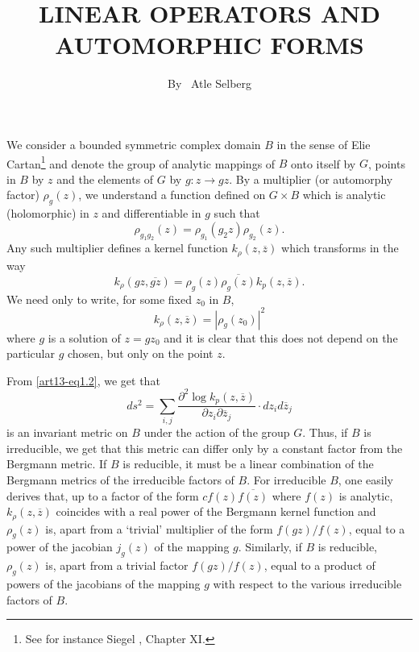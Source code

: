 \title{LINEAR OPERATORS AND AUTOMORPHIC FORMS}

\author{By~ Atle Selberg}

\date{}
\maketitle

\setcounter{pageoriginal}{202}
\section{}\label{art13-sec1}\pageoriginale
We consider a bounded symmetric complex domain $B$ in the sense of Elie Cartan\footnote{See for instance Siegel \cite{art13-key5}, Chapter XI.} and denote the group of analytic mappings of $B$ onto itself by $G$, points in $B$ by $z$ and the elements of $G$ by $g:z\to gz$. By a multiplier (or automorphy factor) $\rho_{g}(z)$, we understand a function defined on $G\times B$ which is analytic (holomorphic) in $z$ and differentiable in $g$ such that
\begin{equation}
\rho_{g_{1}g_{2}}(z)=\rho_{g_{1}}(g_{2}z)\rho_{g_{2}}(z).\label{art13-eq1.1}
\end{equation}
Any such multiplier defines a kernel function $k_{\rho}(z,\overline{z})$ which transforms in the way
\begin{equation}
k_{\rho}(gz,\overline{gz})=\rho_{g}(z)\overline{\rho_{g}(z)}k_{p}(z,\overline{z}).\label{art13-eq1.2}
\end{equation}
We need only to write, for some fixed $z_{0}$ in $B$,
$$
k_{\rho}(z,\overline{z})=|\rho_{g}(z_{0})|^{2}
$$
where $g$ is a solution of $z=gz_{0}$ and it is clear that this does not depend on the particular $g$ chosen, but only on the point $z$.

From \eqref{art13-eq1.2}, we get that
$$
ds^{2}=\sum\limits_{i,j}\frac{\partial^{2}\log k_{p}(z,\overline{z})}{\partial z_{i}\partial\overline{z}_{j}}\cdot dz_{i}d\overline{z}_{j}
$$
is an invariant metric on $B$ under the action of the group $G$. Thus, if $B$ is irreducible, we get that this metric can differ only by a constant factor from the Bergmann metric. If $B$ is reducible, it must be a linear combination of the Bergmann metrics of the irreducible factors of $B$. For irreducible $B$, one easily derives that, up to a factor of the form $cf(z)\overline{f(z)}$ where $f(z)$ is analytic, $k_{\rho}(z,\overline{z})$ coincides with a real power of the Bergmann kernel function and $\rho_{g}(z)$ is, apart from a `trivial' multiplier of the form $f(gz)/f(z)$, equal to a power of the jacobian $j_{g}(z)$ of the mapping $g$. Similarly, if $B$ is reducible, $\rho_{g}(z)$ is, apart from a trivial factor $f(gz)/f(z)$, equal to a product of powers of the jacobians of the mapping $g$ with respect to the various irreducible factors of $B$. 

